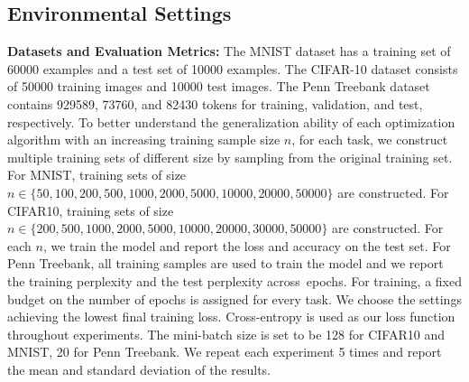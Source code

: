 \documentclass[11pt]{article}
\begin{document}
\vspace{-0.05in}
\subsection{Environmental Settings}

\textbf{Datasets and Evaluation Metrics:}  The MNIST dataset has a training set of 60000 examples and a test set of 10000 examples. The CIFAR-10 dataset consists of 50000 
training images and 10000 test images. The Penn Treebank dataset contains 929589, 73760, and 82430 tokens for training, validation, and test,  respectively.
To better understand the generalization ability of each optimization algorithm with an increasing training sample size $n$, for each task, we construct multiple training sets of different size by sampling from the original training set. For MNIST, training sets of size $n \in \{50, 100, 200, 500, 1000, 2000, 5000, 10000, 20000, 50000 \}$ are constructed. For CIFAR10, training sets of size $n \in \{ 200, 500, 1000, 2000, 5000, 10000, 20000, 30000, 50000\}$ are constructed. 
For each $n$, we train the model and report the loss and accuracy on the test set.  For Penn Treebank, all training samples are used to 
train the model and we
report the training perplexity and the test perplexity across~epochs. For training, a fixed budget on the number of epochs is assigned for every task. We choose the settings achieving the lowest final training loss.  Cross-entropy is used as our loss function throughout experiments. The mini-batch size is set to be 128 for CIFAR10 and MNIST, 20 for Penn Treebank. 
We repeat each experiment 5 times and report the mean and standard deviation of the results.
\end{document}
